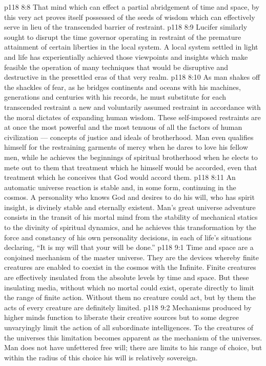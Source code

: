 \vs p118 8:8 That mind which can effect a partial abridgement of time and space, by this very act proves itself possessed of the seeds of wisdom which can effectively serve in lieu of the transcended barrier of restraint.
\vs p118 8:9 Lucifer similarly sought to disrupt the time governor operating in restraint of the premature attainment of certain liberties in the local system. A local system settled in light and life has experientially achieved those viewpoints and insights which make feasible the operation of many techniques that would be disruptive and destructive in the presettled eras of that very realm.
\vs p118 8:10 As man shakes off the shackles of fear, as he bridges continents and oceans with his machines, generations and centuries with his records, he must substitute for each transcended restraint a new and voluntarily assumed restraint in accordance with the moral dictates of expanding human wisdom. These self\hyp{}imposed restraints are at once the most powerful and the most tenuous of all the factors of human civilization --- concepts of justice and ideals of brotherhood. Man even qualifies himself for the restraining garments of mercy when he dares to love his fellow men, while he achieves the beginnings of spiritual brotherhood when he elects to mete out to them that treatment which he himself would be accorded, even that treatment which he conceives that God would accord them.
\vs p118 8:11 An automatic universe reaction is stable and, in some form, continuing in the cosmos. A personality who knows God and desires to do his will, who has spirit insight, is divinely stable and eternally existent. Man’s great universe adventure consists in the transit of his mortal mind from the stability of mechanical statics to the divinity of spiritual dynamics, and he achieves this transformation by the force and constancy of his own personality decisions, in each of life’s situations declaring, “It is my will that your will be done.”
\vs p118 9:1 Time and space are a conjoined mechanism of the master universe. They are the devices whereby finite creatures are enabled to coexist in the cosmos with the Infinite. Finite creatures are effectively insulated from the absolute levels by time and space. But these insulating media, without which no mortal could exist, operate directly to limit the range of finite action. Without them no creature could act, but by them the acts of every creature are definitely limited.
\vs p118 9:2 Mechanisms produced by higher minds function to liberate their creative sources but to some degree unvaryingly limit the action of all subordinate intelligences. To the creatures of the universes this limitation becomes apparent as the mechanism of the universes. Man does not have unfettered free will; there are limits to his range of choice, but within the radius of this choice his will is relatively sovereign.
